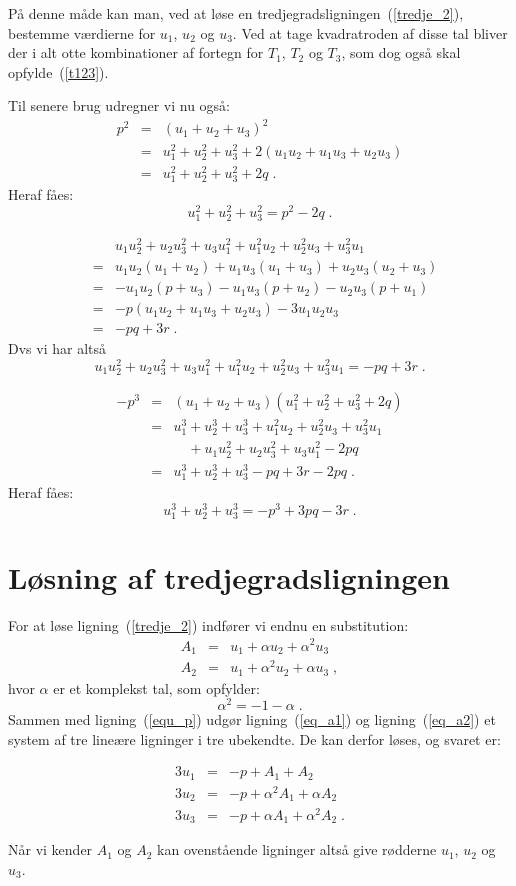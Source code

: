 \documentclass[12pt,oneside,a4paper]{article}
\newcommand{\bas}{\begin{eqnarray*}}
\newcommand{\eas}{\end{eqnarray*}}
\newcommand{\bea}{\begin{eqnarray}}
\newcommand{\eea}{\end{eqnarray}}
\begin{document}
På denne måde kan man, ved at løse en tredjegradsligningen~(\ref{tredje_2}),
bestemme værdierne for $u_1$, $u_2$ og $u_3$. Ved at tage kvadratroden af disse
tal bliver der i alt otte kombinationer af fortegn for $T_1$, $T_2$ og $T_3$,
som dog også skal opfylde~(\ref{t123}).

Til senere brug udregner vi nu også:
\bas
p^2 &=& (u_1 + u_2 + u_3)^2 \\
&=& u_1^2 + u_2^2 + u_3^2 + 2(u_1u_2 + u_1u_3 + u_2u_3) \\
&=& u_1^2 + u_2^2 + u_3^2 + 2q \;.
\eas
Heraf fåes:
\begin{equation}
u_1^2 + u_2^2 + u_3^2 = p^2 - 2q\;.
\end{equation}

\bas
&& u_1u_2^2 + u_2u_3^2 + u_3u_1^2 + u_1^2u_2 + u_2^2u_3 + u_3^2u_1 \\
&=& u_1u_2(u_1+u_2) + u_1u_3(u_1+u_3) + u_2u_3(u_2+u_3) \\
&=& -u_1u_2(p+u_3) - u_1u_3(p+u_2) - u_2u_3(p+u_1) \\
&=& -p(u_1u_2 + u_1u_3 + u_2u_3) - 3u_1u_2u_3 \\
&=& -pq + 3r \;.
\eas
Dvs vi har altså
\begin{equation}
u_1u_2^2 + u_2u_3^2 + u_3u_1^2 + u_1^2u_2 + u_2^2u_3 + u_3^2u_1 
= -pq + 3r \;.
\label{eq_u1_u22}
\end{equation}

\bas
-p^3 &=& (u_1+u_2+u_3)(u_1^2+u_2^2+u_3^2 + 2q) \\
&=& u_1^3 + u_2^3 + u_3^3 + u_1^2u_2 + u_2^2u_3 + u_3^2u_1 \\
&& \quad + u_1u_2^2 + u_2u_3^2 + u_3u_1^2 - 2pq \\
&=& u_1^3 + u_2^3 + u_3^3 - pq+3r - 2pq \;.
\eas
Heraf fåes:
\begin{equation}
u_1^3 + u_2^3 + u_3^3 = -p^3 + 3pq - 3r \;.
\end{equation}

\section{Løsning af tredjegradsligningen}
For at løse ligning~(\ref{tredje_2}) indfører vi endnu en substitution:
\bea
A_1 &=& u_1 + \alpha u_2 + \alpha^2 u_3 \label{eq_a1}\\
A_2 &=& u_1 + \alpha^2 u_2 + \alpha u_3  \label{eq_a2}\;,
\eea
hvor $\alpha$ er et komplekst tal, som opfylder:
\begin{equation}
\alpha^2 = -1 - \alpha \;.
\end{equation}
Sammen med ligning~(\ref{equ_p}) udgør ligning~(\ref{eq_a1}) og
ligning~(\ref{eq_a2}) et system af tre lineære ligninger i tre ubekendte.
De kan derfor løses, og svaret er:
\begin{tcolorbox}
\bea
3u_1 &=& -p + A_1 + A_2 \label{eq_u1}\\
3u_2 &=& -p + \alpha^2 A_1 + \alpha A_2 \label{eq_u2}\\
3u_3 &=& -p + \alpha A_1 + \alpha^2 A_2 \label{eq_u3}\;.
\eea
\end{tcolorbox}
Når vi kender $A_1$ og $A_2$ kan ovenstående ligninger altså give rødderne
$u_1$, $u_2$ og $u_3$.
\end{document}
